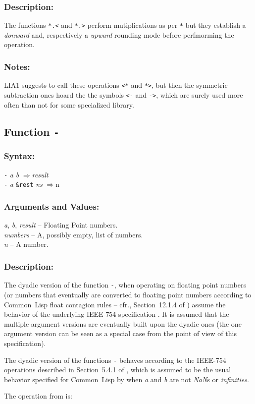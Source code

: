 \documentclass[10pt,fleqn]{article}
\newcommand{\CL}{\textsf{Common~Lisp}}
\newcommand{\code}[1]{\texttt{#1}}
\newcommand{\varname}[1]{\textit{#1}}
\newcommand{\RArrow}{$\Rightarrow$}
\newcommand{\IEEEFPStd}{IEEE-754}
\newcommand{\DDictionaryItem}[1]{\vspace*{6pt}\noindent\hrulefill\vspace*{-9pt}\subsection*{#1}}
\newcommand{\DSyntax}{\subsubsection*{Syntax:}}
\newcommand{\DArgsNValues}{\subsubsection*{Arguments and Values:}}
\newcommand{\DDescription}{\subsubsection*{Description:}}
\newcommand{\DNotes}{\subsubsection*{Notes:}}
\begin{document}
\DDescription{}

The functions  \code{*.<} and \code{*.>} perform mutiplications as per \code{*}
but they establish a \emph{donward} and, respectively a
\emph{upward} rounding mode before perfmorming the operation.

\DNotes{}

LIA1 suggests to call these operations \code{<*} and \code{*>}, but
then the symmetric subtraction ones hoard the the symbols \code{<-}
and \code{->}, which are surely used more often than not for some
specialized library.


\DDictionaryItem{Function \code{-}}
\index{*!\code{-}}

\DSyntax{}

\code{-} \varname{a} \varname{b} \RArrow \varname{result}\\
\code{-} \varname{a} \code{\&rest} \varname{ns} \RArrow \varname \code{n}\\

\DArgsNValues{}

\varname{a}, \varname{b}, \varname{result} -- Floating Point numbers.\\
\varname{numbers} -- A, possibly empty, list of numbers.\\
\varname{n} -- A number.

\DDescription{}

The dyadic version of the function \code{-}, when operating on
floating point numbers (or numbers that eventually are converted to
floating point numbers according to \CL{} float contagion rules -- cfr.,
Section~12.1.4 of \cite{1996:ANSIHyperSpec}) assume the behavior of the
underlying \IEEEFPStd{} specification \cite{2008:IEEE-754}.  It is assumed that
the multiple argument versions are eventually built upon the dyadic
ones (the one argument version can be seen as a special case from
the point of view of this specification).

The dyadic version of the functions \code{-} behaves
according to the \IEEEFPStd{} operations described in Section~5.4.1 of
\cite{2008:IEEE-754}, which is assumed to be the usual behavior specified
for \CL{} by \cite{1996:ANSIHyperSpec} when \varname{a} and \varname{b} are
not \emph{NaN}s or \emph{infinities}.

\noindent
The operation from \cite{2008:IEEE-754} is:

\vspace*{3mm}
\end{document}
